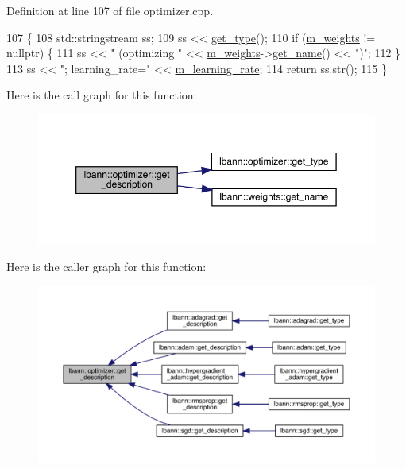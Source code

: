 Definition at line 107 of file optimizer.\+cpp.


\begin{DoxyCode}
107                                            \{
108   std::stringstream ss;
109   ss << \hyperlink{classlbann_1_1optimizer_a7b7a6814e14eeee157e1cbb7f15dd4ff}{get\_type}();
110   \textcolor{keywordflow}{if} (\hyperlink{classlbann_1_1optimizer_a33b57b578a089d9ffe6715bb3996907c}{m\_weights} != \textcolor{keyword}{nullptr}) \{
111     ss << \textcolor{stringliteral}{" (optimizing "} << \hyperlink{classlbann_1_1optimizer_a33b57b578a089d9ffe6715bb3996907c}{m\_weights}->\hyperlink{classlbann_1_1weights_a272f80766f31a5add7a970e5e8fcc352}{get\_name}() << \textcolor{stringliteral}{")"};
112   \}
113   ss << \textcolor{stringliteral}{"; learning\_rate="} << \hyperlink{classlbann_1_1optimizer_ad393dcdcb82b44510c586ed5ec46d4dd}{m\_learning\_rate};
114   \textcolor{keywordflow}{return} ss.str();
115 \}
\end{DoxyCode}
Here is the call graph for this function\+:\nopagebreak
\begin{figure}[H]
\begin{center}
\leavevmode
\includegraphics[width=350pt]{classlbann_1_1optimizer_a66bb8d28dfb41452ac1a75a3efd47723_cgraph}
\end{center}
\end{figure}
Here is the caller graph for this function\+:\nopagebreak
\begin{figure}[H]
\begin{center}
\leavevmode
\includegraphics[width=350pt]{classlbann_1_1optimizer_a66bb8d28dfb41452ac1a75a3efd47723_icgraph}
\end{center}
\end{figure}
\mbox{\label{classlbann_1_1optimizer_a12b7dbc72eb2de78d6ad798b8939f349}} 
